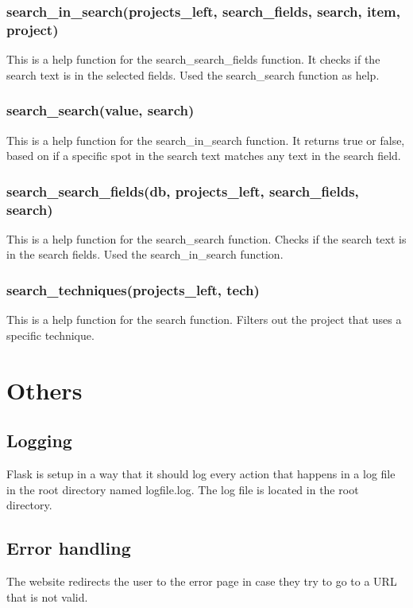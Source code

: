 \documentclass{TDP003mall}
\begin{document}
\subsubsection{search\_in\_search(projects\_left, search\_fields, search, item, project)}
  This is a help function for the search\_search\_fields function. It checks if the search text is in the selected fields. Used the search\_search function as help.\\

\subsubsection{search\_search(value, search)}
  This is a help function for the search\_in\_search function. It returns true or false, based on if a specific spot in the search text matches any text in the search field.\\

\subsubsection{search\_search\_fields(db, projects\_left, search\_fields, search)}
  This is a help function for the search\_search function. 
  Checks if the search text is in the search fields. Used the search\_in\_search function.\\

\subsubsection{search\_techniques(projects\_left, tech)}
  This is a help function for the search function. 
  Filters out the project that uses a specific technique.\\


\newpage
\section{Others}

\subsection{Logging}
Flask is setup in a way that it should log every action that happens in a log file in the root directory named logfile.log. The log file is located in the root directory.

\subsection{Error handling}
The website redirects the user to the error page in case they try to go to a URL that is not valid.\\
\end{document}
